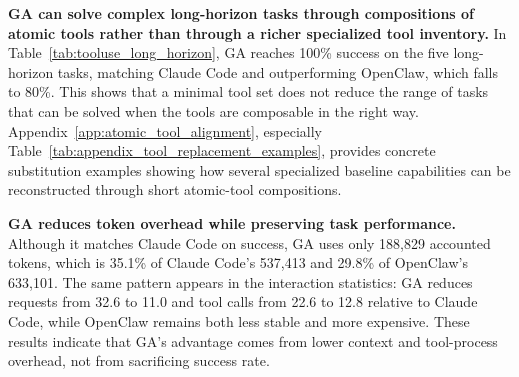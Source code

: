 \begin{table}[t]
\centering
\caption{\textbf{Results on long-horizon complex tasks.} The five tasks cover document generation (PDF/PPT creation), SQL copilot query generation, experiment analysis report writing, procurement decision-making with web retrieval, and research paper reproduction feasibility analysis. This table reports the average outcomes over the long-horizon task set rather than expanding into per-task detail.}
\def\arraystretch{0.99}
\setlength{\tabcolsep}{0.42em}
\label{tab:tooluse_long_horizon}
\end{table}

\textbf{GA can solve complex long-horizon tasks through compositions of atomic tools rather than through a richer specialized tool inventory.} In Table~\ref{tab:tooluse_long_horizon}, GA reaches 100\% success on the five long-horizon tasks, matching Claude Code and outperforming OpenClaw, which falls to 80\%. This shows that a minimal tool set does not reduce the range of tasks that can be solved when the tools are composable in the right way. Appendix~\ref{app:atomic_tool_alignment}, especially Table~\ref{tab:appendix_tool_replacement_examples}, provides concrete substitution examples showing how several specialized baseline capabilities can be reconstructed through short atomic-tool compositions.

\textbf{GA reduces token overhead while preserving task performance.} Although it matches Claude Code on success, GA uses only 188,829 accounted tokens, which is 35.1\% of Claude Code's 537,413 and 29.8\% of OpenClaw's 633,101. The same pattern appears in the interaction statistics: GA reduces requests from 32.6 to 11.0 and tool calls from 22.6 to 12.8 relative to Claude Code, while OpenClaw remains both less stable and more expensive. These results indicate that GA's advantage comes from lower context and tool-process overhead, not from sacrificing success rate.

